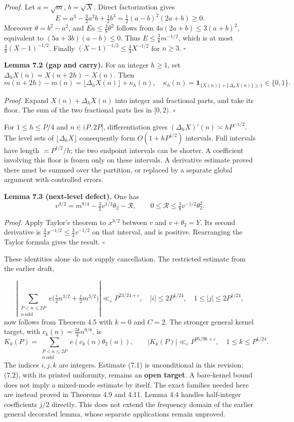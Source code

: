 \documentclass[11pt,a4paper]{article}
\begin{document}
\emph{Proof.} Let \(a=\sqrt m\), \(b=\sqrt X\). Direct factorization
gives \[
E=a^3-\tfrac32a^2b+\tfrac12b^3
=\tfrac12(a-b)^2(2a+b)\ge0.
\] Moreover \(\theta=b^2-a^2\), and \(Ea\le\tfrac38\theta^2\) follows
from \(4a(2a+b)\le3(a+b)^2\), equivalent to \((5a+3b)(a-b)\le0\). Thus
\(E\le\tfrac38m^{-1/2}\), which is at most \(\tfrac38(X-1)^{-1/2}\).
Finally \((X-1)^{-1/2}\le\tfrac43X^{-1/2}\) for \(n\ge3\). \(\square\)


\textbf{Lemma 7.2 (gap and carry).} For an integer \(h\ge1\), set
\(\Delta_hX(n)=X(n+2h)-X(n)\). Then \[
m(n+2h)-m(n)=\lfloor\Delta_hX(n)\rfloor+\kappa_h(n),
\quad
\kappa_h(n)=\mathbf1_{\{X(n)\}+\{\Delta_hX(n)\}\ge1}\in\{0,1\}.
\]

\emph{Proof.} Expand \(X(n)+\Delta_hX(n)\) into integer and fractional
parts, and take its floor. The sum of the two fractional parts lies in
\([0,2)\). \(\square\)

For \(1\le h\le P/4\) and \(n\in(P,2P]\), differentiation gives
\((\Delta_hX)'(n)\asymp hP^{-1/2}\). The level sets of
\(\lfloor\Delta_hX\rfloor\) consequently form \(O(1+hP^{1/2})\)
intervals. Full intervals have length \(\asymp P^{1/2}/h\); the two
endpoint intervals can be shorter. A coefficient involving this floor is
frozen only on these intervals. A derivative estimate proved there must
be summed over the partition, or replaced by a separate global argument
with controlled errors.


\textbf{Lemma 7.3 (next-level defect).} One has \[
v^{3/2}=m^{9/4}-\tfrac32v^{1/2}\theta_2-\mathcal R,
\qquad 0\le\mathcal R\le\tfrac38v^{-1/2}\theta_2^2.
\]

\emph{Proof.} Apply Taylor's theorem to \(x^{3/2}\) between \(v\) and
\(v+\theta_2=Y\). Its second derivative is
\(\tfrac34x^{-1/2}\le\tfrac34v^{-1/2}\) on that interval, and is
positive. Rearranging the Taylor formula gives the result. \(\square\)

These identities alone do not supply cancellation. The restricted
estimate from the earlier draft,

\[
\left|\sum_{\substack{P<n\le2P\\n\ \mathrm{odd}}}
e\bigl(\tfrac i2 n^{3/2}+\tfrac j2m^{3/2}\bigr)\right|
\ll_\varepsilon P^{23/24+\varepsilon},
\quad |i|\le2P^{1/24},\quad1\le|j|\le2P^{1/24},
\tag{7.1}
\] now follows from Theorem 4.5 with \(k=0\) and \(C=2\). The stronger
general kernel target, with \(c_k(n)=\tfrac{3k}{4}n^{9/8}\), is \[
K_k(P)=\sum_{\substack{P<n\le2P\\n\ \mathrm{odd}}}
e(c_k(n)\theta_2(n)),
\qquad |K_k(P)|\ll_\varepsilon P^{95/96+\varepsilon},
\quad1\le k\le P^{1/24}.
\tag{7.2}
\] The indices \(i,j,k\) are integers. Estimate (7.1) is unconditional
in this revision; (7.2), with its printed uniformity, remains an
\textbf{open target}. A bare-kernel bound does not imply a mixed-mode
estimate by itself. The exact families needed here are instead proved in
Theorems 4.9 and 4.11. Lemma 4.4 handles half-integer coefficients
\(j/2\) directly. This does not extend the frequency domain of the
earlier general decorated lemma, whose separate applications remain
unproved.
\end{document}
